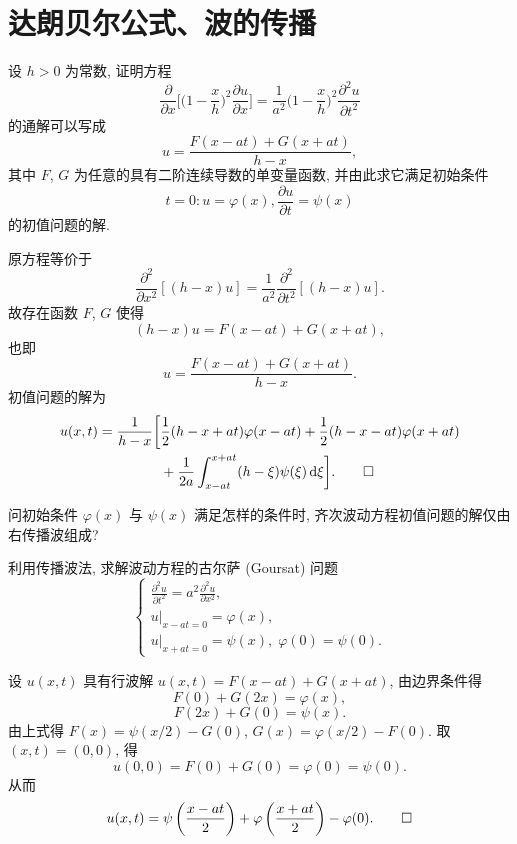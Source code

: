 \section{达朗贝尔公式、波的传播}

\begin{exercise}
  设 $h>0$ 为常数, 证明方程
  \[\frac{\partial}{\partial x}\biggl[\biggl(1-\frac{x}{h}\biggr)^2
    \frac{\partial u}{\partial x}\biggr]
    = \frac{1}{a^2}\biggl(1-\frac{x}{h}\biggr)^2 \frac{\partial^2u}{\partial t^2}\]
  的通解可以写成
  \[u = \frac{F(x-at)+G(x+at)}{h-x},\]
  其中 $F$, $G$ 为任意的具有二阶连续导数的单变量函数, 并由此求它满足初始条件
  \[t=0: u = \varphi(x), \frac{\partial u}{\partial t} = \psi(x)\]
  的初值问题的解.
\end{exercise}

\begin{solve}
  原方程等价于
  \[\frac{\partial^2}{\partial x^2}[(h-x)u]
    = \frac{1}{a^2}\frac{\partial^2}{\partial t^2}[(h-x)u].\]
  故存在函数 $F$, $G$ 使得
  \[(h-x)u = F(x-at) + G(x+at),\]
  也即
  \[u = \frac{F(x-at)+G(x+at)}{h-x}.\]
  初值问题的解为
  \begin{align*}
    u(x,t)
     = \frac{1}{h-x}\biggl[
      & \frac12 (h-x+at)\varphi(x-at) + \frac12 (h-x-at)\varphi(x+at) \\
      & + \frac{1}{2a}\int_{x-at}^{x+at} (h-\xi)\psi(\xi)\mathop{}\!\mathrm{d}\xi\biggr]. \qedhere
  \end{align*}
\end{solve}


\begin{exercise}
  问初始条件 $\varphi(x)$ 与 $\psi(x)$ 满足怎样的条件时,
  齐次波动方程初值问题的解仅由右传播波组成?
\end{exercise}


\begin{exercise}[3]
  利用传播波法, 求解波动方程的古尔萨 (Goursat) 问题
  \[\begin{cases}
    \frac{\partial^2u}{\partial t^2} = a^2 \frac{\partial^2u}{\partial x^2}, \\
    u|_{x-at=0} = \varphi(x), \\
    u|_{x+at=0} = \psi(x),\; \varphi(0) = \psi(0).
  \end{cases}\]
\end{exercise}

\begin{solve}
  设 $u(x,t)$ 具有行波解 $u(x,t) = F(x-at)+G(x+at)$, 由边界条件得
  \[F(0)+G(2x) = \varphi(x),\]
  \[F(2x)+G(0) = \psi(x).\]
  由上式得 $F(x) = \psi(x/2)-G(0)$, $G(x) = \varphi(x/2)-F(0)$.
  取 $(x,t) = (0,0)$, 得
  \[u(0,0) = F(0) + G(0) = \varphi(0) = \psi(0).\]
  从而
  \[u(x,t) = \psi\left(\frac{x-at}{2}\right)
    + \varphi\left(\frac{x+at}{2}\right)-\varphi(0).\qedhere\]
\end{solve}


